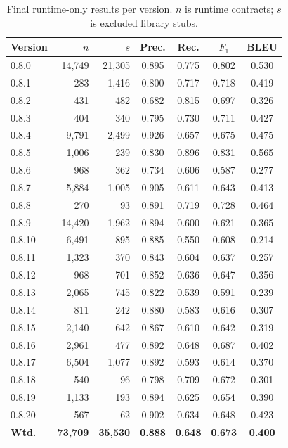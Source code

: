 \documentclass{article}
\begin{document}
\begin{table}[t]
\centering
\caption{Final runtime-only results per version. $n$ is runtime contracts; $s$ is
excluded library stubs.}
\label{tab:perversion}
\scriptsize
\begin{tabular}{l r r c c c c}
\toprule
Version & $n$ & $s$ & Prec. & Rec. & $F_1$ & BLEU \\
\midrule
0.8.0  & 14{,}749 & 21{,}305 & 0.895 & 0.775 & 0.802 & 0.530 \\
0.8.1  & 283      & 1{,}416  & 0.800 & 0.717 & 0.718 & 0.419 \\
0.8.2  & 431      & 482      & 0.682 & 0.815 & 0.697 & 0.326 \\
0.8.3  & 404      & 340      & 0.795 & 0.730 & 0.711 & 0.427 \\
0.8.4  & 9{,}791  & 2{,}499  & 0.926 & 0.657 & 0.675 & 0.475 \\
0.8.5  & 1{,}006  & 239      & 0.830 & 0.896 & 0.831 & 0.565 \\
0.8.6  & 968      & 362      & 0.734 & 0.606 & 0.587 & 0.277 \\
0.8.7  & 5{,}884  & 1{,}005  & 0.905 & 0.611 & 0.643 & 0.413 \\
0.8.8  & 270      & 93       & 0.891 & 0.719 & 0.728 & 0.464 \\
0.8.9  & 14{,}420 & 1{,}962  & 0.894 & 0.600 & 0.621 & 0.365 \\
0.8.10 & 6{,}491  & 895      & 0.885 & 0.550 & 0.608 & 0.214 \\
0.8.11 & 1{,}323  & 370      & 0.843 & 0.604 & 0.637 & 0.257 \\
0.8.12 & 968      & 701      & 0.852 & 0.636 & 0.647 & 0.356 \\
0.8.13 & 2{,}065  & 745      & 0.822 & 0.539 & 0.591 & 0.239 \\
0.8.14 & 811      & 242      & 0.880 & 0.583 & 0.616 & 0.307 \\
0.8.15 & 2{,}140  & 642      & 0.867 & 0.610 & 0.642 & 0.319 \\
0.8.16 & 2{,}961  & 477      & 0.892 & 0.648 & 0.687 & 0.402 \\
0.8.17 & 6{,}504  & 1{,}077  & 0.892 & 0.593 & 0.614 & 0.370 \\
0.8.18 & 540      & 96       & 0.798 & 0.709 & 0.672 & 0.301 \\
0.8.19 & 1{,}133  & 193      & 0.894 & 0.625 & 0.654 & 0.390 \\
0.8.20 & 567      & 62       & 0.902 & 0.634 & 0.648 & 0.423 \\
\midrule
\textbf{Wtd.} & \textbf{73{,}709} & \textbf{35{,}530} & \textbf{0.888} & \textbf{0.648} & \textbf{0.673} & \textbf{0.400} \\
\bottomrule
\end{tabular}
\end{table}
\end{document}
